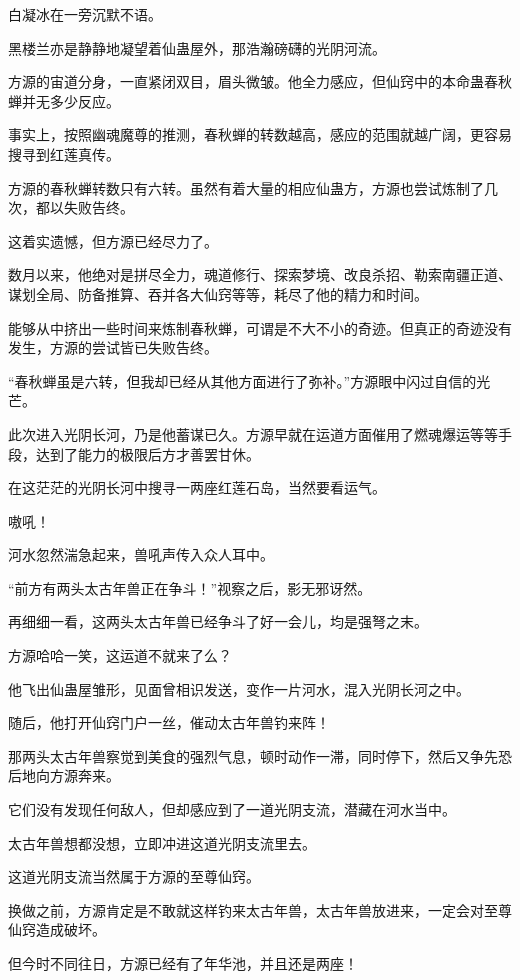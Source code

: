 \begin{this_body}
白凝冰在一旁沉默不语。

黑楼兰亦是静静地凝望着仙蛊屋外，那浩瀚磅礴的光阴河流。

方源的宙道分身，一直紧闭双目，眉头微皱。他全力感应，但仙窍中的本命蛊春秋蝉并无多少反应。

事实上，按照幽魂魔尊的推测，春秋蝉的转数越高，感应的范围就越广阔，更容易搜寻到红莲真传。

方源的春秋蝉转数只有六转。虽然有着大量的相应仙蛊方，方源也尝试炼制了几次，都以失败告终。

这着实遗憾，但方源已经尽力了。

数月以来，他绝对是拼尽全力，魂道修行、探索梦境、改良杀招、勒索南疆正道、谋划全局、防备推算、吞并各大仙窍等等，耗尽了他的精力和时间。

能够从中挤出一些时间来炼制春秋蝉，可谓是不大不小的奇迹。但真正的奇迹没有发生，方源的尝试皆已失败告终。

“春秋蝉虽是六转，但我却已经从其他方面进行了弥补。”方源眼中闪过自信的光芒。

此次进入光阴长河，乃是他蓄谋已久。方源早就在运道方面催用了燃魂爆运等等手段，达到了能力的极限后方才善罢甘休。

在这茫茫的光阴长河中搜寻一两座红莲石岛，当然要看运气。

嗷吼！

河水忽然湍急起来，兽吼声传入众人耳中。

“前方有两头太古年兽正在争斗！”视察之后，影无邪讶然。

再细细一看，这两头太古年兽已经争斗了好一会儿，均是强弩之末。

方源哈哈一笑，这运道不就来了么？

他飞出仙蛊屋雏形，见面曾相识发送，变作一片河水，混入光阴长河之中。

随后，他打开仙窍门户一丝，催动太古年兽钓来阵！

那两头太古年兽察觉到美食的强烈气息，顿时动作一滞，同时停下，然后又争先恐后地向方源奔来。

它们没有发现任何敌人，但却感应到了一道光阴支流，潜藏在河水当中。

太古年兽想都没想，立即冲进这道光阴支流里去。

这道光阴支流当然属于方源的至尊仙窍。

换做之前，方源肯定是不敢就这样钓来太古年兽，太古年兽放进来，一定会对至尊仙窍造成破坏。

但今时不同往日，方源已经有了年华池，并且还是两座！


\end{this_body}
